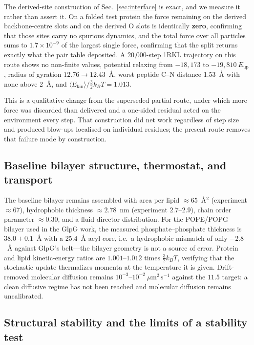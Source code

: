 \documentclass[journal=jctcce,manuscript=article,layout=twocolumn]{achemso}
\begin{document}
The derived-site construction of Sec.~\ref{sec:interface} is exact, and we measure
it rather than assert it. On a folded test protein the force remaining on the
derived backbone-centre slots and on the derived O slots is identically
\textbf{zero}, confirming that those sites carry no spurious dynamics, and the total
force over all particles sums to $1.7\times10^{-9}$ of the largest single force,
confirming that the split returns exactly what the pair table deposited. A
20{,}000-step 1RKL trajectory on this route shows no non-finite values, potential
relaxing from $-18{,}173$ to $-19{,}810~E_\mathrm{up}$, radius of gyration
$12.76\rightarrow12.43$~\AA, worst peptide C--N distance 1.53~\AA{} with none above
2~\AA, and $\langle E_\mathrm{kin}\rangle/\tfrac32k_BT=1.013$.

This is a qualitative change from the superseded partial route, under which more
force was discarded than delivered and a one-sided residual acted on the environment
every step. That construction did net work regardless of step size and produced
blow-ups localised on individual residues; the present route removes that failure
mode by construction.

\subsection{Baseline bilayer structure, thermostat, and transport}
\label{sec:structure}

The baseline bilayer remains assembled with area per lipid $\approx65$~\AA$^2$
(experiment $\approx67$), hydrophobic thickness $\approx2.78$~nm (experiment
$2.7$--$2.9$), chain order parameter $\approx0.30$, and a fluid director
distribution. For the POPE/POPG bilayer used in the GlpG work, the measured
phosphate--phosphate thickness is $38.0\pm0.1$~\AA{} with a $25.4$~\AA{} acyl core,
i.e.\ a hydrophobic mismatch of only $-2.8$~\AA{} against GlpG's belt---the bilayer
geometry is not a source of error. Protein and lipid kinetic-energy ratios are
$1.001$--$1.012$ times $\tfrac32k_BT$, verifying that the stochastic update
thermalizes momenta at the temperature it is given. Drift-removed molecular
diffusion remains $10^{-3}$--$10^{-2}~\mu\mathrm{m}^2\,\mathrm{s}^{-1}$ against the
$11.5$ target: a clean diffusive regime has not been reached and molecular diffusion
remains uncalibrated.

\subsection{Structural stability and the limits of a stability test}
\label{sec:hybrid}
\end{document}
